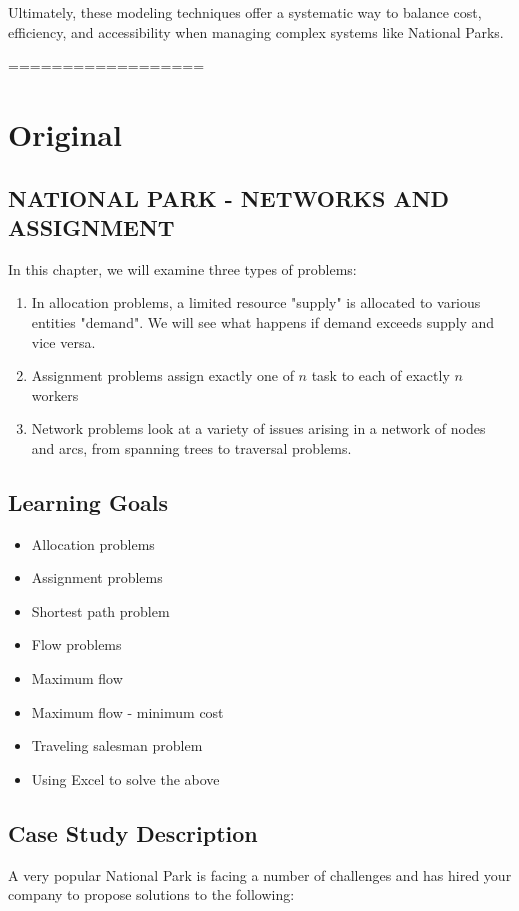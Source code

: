 Ultimately, these modeling techniques offer a systematic way to balance cost, efficiency, and accessibility when managing complex systems like National Parks.




==================

\chapter*{Original}
\section*{NATIONAL PARK - NETWORKS AND ASSIGNMENT}
In this chapter, we will examine three types of problems:

\begin{enumerate}
  \item In allocation problems, a limited resource "supply" is allocated to various entities "demand". We will see what happens if demand exceeds supply and vice versa.
  \item Assignment problems assign exactly one of $n$ task to each of exactly $n$ workers
  \item Network problems look at a variety of issues arising in a network of nodes and arcs, from spanning trees to traversal problems.
\end{enumerate}

\section*{Learning Goals}
\begin{itemize}
  \item Allocation problems
  \item Assignment problems
  \item Shortest path problem
  \item Flow problems
  \item Maximum flow
  \item Maximum flow - minimum cost
  \item Traveling salesman problem
  \item Using Excel to solve the above
\end{itemize}

\section*{Case Study Description}
A very popular National Park is facing a number of challenges and has hired your company to propose solutions to the following:

